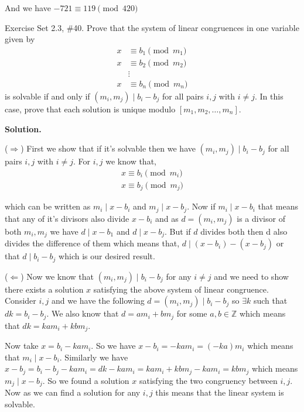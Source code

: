 \documentclass[12pt]{exam}
\begin{document}
\begin{questions}
And we have $-721 \equiv 119 \pmod {420}$


            

\newpage 
\question  Exercise Set 2.3, \#40.
Prove that the system of linear congruences in one variable given by 
\begin{align*}
x & \equiv b_1 \pmod{m_1} \\
x & \equiv b_2 \pmod{m_2} \\
& \vdots \\
x & \equiv b_n \pmod{m_n}
\end{align*}
is solvable if and only if $(m_i,m_j) \mid b_i-b_j$ for all pairs $i,j$ with $i \neq j$. In this case, prove that each solution is unique modulo $[m_1,m_2,\ldots,m_n]$.


\textbf{Solution.}

($\Rightarrow$)
First we show that if it's solvable then we have $(m_i, m_j) \mid b_i - b_j$ for all pairs $i, j$ with $i \ne j$. For $i, j$ we know that,
\begin{align*}
x \equiv b_{i} \pmod {m_{i}}\\
x \equiv b_{j} \pmod {m_{j}}
\end{align*}

which can be written as $m_{i} \mid x - b_{i} $ and $m_{j} \mid x - b_{j}$. Now if $m_{i} \mid x - b_{i}$ that means that any of it's divisors also divide $x - b_{i}$ and as $d = (m_i, m_j)$ is a divisor of both $m_i, m_j$ we have $d \mid x - b_{1}$ and $d \mid x - b_{j}$. But if $d$ divides both then d also divides the difference of them which means that, $d \mid (x - b_{i}) - (x - b_j)$ or that $d \mid b_i - b_j$ which is our desired result.


($\Leftarrow$)
Now we know that $(m_i, m_j) \mid b_i - b_j$  for any $i\ne j$ and we need to show there exists a solution $x$ satisfying the above system of linear congruence. Consider $i, j$ and we have the following $d = (m_i, m_j) \mid b_i - b_j$ so $\exists k$ such that $dk = b_i - b_j$. We also know that $d = am_i + bm_j$ for some $a, b \in \mathbb{Z}$ which means that $dk = kam_i +  kbm_j$.  

\vspace{1em}


Now take $x = b_i  - kam_i$. So we have $x - b_i = - kam_i = (-ka) m_i$  which means that $m_i \mid x - b_i$. Similarly we have $x - b_j = b_i - b_j - kam_i = dk - kam_i = kam_i + kbm_j - kam_i = kbm_j$ which means $m_j \mid x - b_j$. So we found a solution $x$ satisfying the two congruency between $i, j$. Now as we can find a solution for any $i, j$ this means that the linear system is solvable.



\end{questions}
\end{document}
